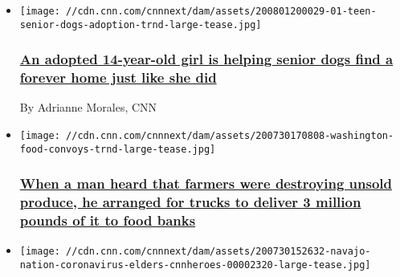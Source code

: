 \begin{itemize}
\item
  \href{/2020/08/02/us/teen-senior-dogs-adoption-trnd/index.html}{}

  \texttt{[image: //cdn.cnn.com/cnnnext/dam/assets/200801200029-01-teen-senior-dogs-adoption-trnd-large-tease.jpg]}

  \hypertarget{an-adopted-14-year-old-girl-is-helping-senior-dogs-find-a-forever-home-just-like-she-did}{%
  \subsubsection{\texorpdfstring{\href{/2020/08/02/us/teen-senior-dogs-adoption-trnd/index.html}{An
  adopted 14-year-old girl is helping senior dogs find a forever home
  just like she
  did}}{An adopted 14-year-old girl is helping senior dogs find a forever home just like she did}}\label{an-adopted-14-year-old-girl-is-helping-senior-dogs-find-a-forever-home-just-like-she-did}}

  By Adrianne Morales, CNN
\item
  \href{/2020/08/01/us/washington-food-convoys-help-farmers-food-banks-trnd/index.html}{}

  \texttt{[image: //cdn.cnn.com/cnnnext/dam/assets/200730170808-washington-food-convoys-trnd-large-tease.jpg]}

  \hypertarget{when-a-man-heard-that-farmers-were-destroying-unsold-produce-he-arranged-for-trucks-to-deliver-3-million-pounds-of-it-to-food-banks}{%
  \subsubsection{\texorpdfstring{\href{/2020/08/01/us/washington-food-convoys-help-farmers-food-banks-trnd/index.html}{When
  a man heard that farmers were destroying unsold produce, he arranged
  for trucks to deliver 3 million pounds of it to food
  banks}}{When a man heard that farmers were destroying unsold produce, he arranged for trucks to deliver 3 million pounds of it to food banks}}\label{when-a-man-heard-that-farmers-were-destroying-unsold-produce-he-arranged-for-trucks-to-deliver-3-million-pounds-of-it-to-food-banks}}
\item
  \href{/2020/07/30/us/navajo-nation-coronavirus-elders-cnnheroes/index.html}{}

  \texttt{[image: //cdn.cnn.com/cnnnext/dam/assets/200730152632-navajo-nation-coronavirus-elders-cnnheroes-00002320-large-tease.jpg]}


\end{itemize}
